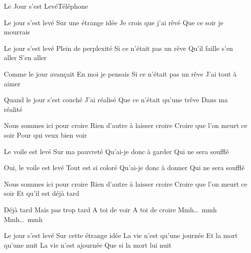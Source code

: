 \documentclass[a4paper,11pt,french]{article}
\begin{document}
\begin{Song}{Le Jour s'est Levé}{Téléphone}
\begin{multicols}{2}

\begin{Verse}
Le jour s'est levé
Sur une étrange idée
Je crois que j'ai rêvé
Que ce soir je mourrais
\espaceInterStrophe

Le jour s'est levé
Plein de perplexité
Si ce n'était pas un rêve
Qu'il faille s'en aller
S'en aller
\end{Verse}
\espaceInterStrophe

\espaceInterStrophe

\begin{Verse}
Comme le jour avançait
En moi je pensais
Si ce n'était pas un rêve
J'ai tout à aimer
\espaceInterStrophe

Quand le jour s'est couché
J'ai réalisé
Que ce n'était qu'une trêve
Dans ma réalité
\end{Verse}
\espaceInterStrophe

\begin{Chorus}
Nous sommes ici pour croire
Rien d'autre à laisser croire
Croire que l'on meurt ce soir
Pour qui veux bien voir
\end{Chorus}
\vfill
\columnbreak

\begin{Verse}
Le voile est levé
Sur ma pauvreté
Qu'ai-je donc à garder
Qui ne sera soufflé
\espaceInterStrophe

Oui, le voile est levé
Tout est si coloré
Qu'ai-je donc à donner
Qui ne sera soufflé
\end{Verse}
\espaceInterStrophe

\begin{Chorus}
Nous sommes ici pour croire
Rien d'autre à laisser croire
Croire que l'on meurt ce soir
Et qu'il est déjà tard
\end{Chorus}
\espaceInterStrophe

\begin{Bridge}
Déjà tard
Mais pas trop tard
A toi de voir
A toi de croire
Mmh\dots\ mmh
Mmh\dots\ mmh
\end{Bridge}
\espaceInterStrophe

\begin{Verse}
Le jour s'est levé
Sur cette étrange idée
La vie n'est qu'une journée
Et la mort qu'une nuit
La vie n'est ajournée
Que si la mort lui nuit
\end{Verse}
\end{multicols}


\end{Song}
\end{document}

